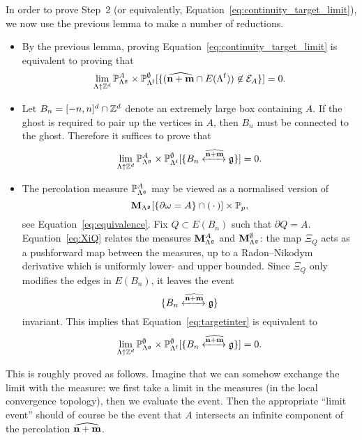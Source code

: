 In order to prove Step~2 (or equivalently, Equation~\eqref{eq:continuity_target_limit}),
we now use the previous lemma to make a number of reductions.
\begin{itemize}
    \item By the previous lemma,
    proving Equation~\eqref{eq:continuity_target_limit} is equivalent to proving that 
    \[
        \lim_{\Lambda\uparrow\mathbb Z^d}
        \mathbb P_{\Lambda^\mathfrak g}^A\times\mathbb P_{\Lambda^{\operatorname{f}}}^\emptyset
            [\{(\widehat{\mathbf{n}+\mathbf{m}}\cap E(\Lambda^{\operatorname{f}}))\not\in\mathcal E_A\}]=0.
    \]
    \item Let $B_n=[-n,n]^d\cap \mathbb Z^d$ denote an extremely large box
    containing $A$.
    If the ghost is required to pair up the vertices in $A$,
    then $B_n$ must be connected to the ghost.
    Therefore it suffices to prove that
    \begin{equation}
        \label{eq:targetinter}
        \lim_{\Lambda\uparrow\Z^d}
        \P_{\Lambda^\frakg}^A\times\P_{\Lambda^\f}^\emptyset
            [\{B_n \xleftrightarrow{\widehat{\n+\m}}\frakg\}]=0.
    \end{equation}
    \item The percolation measure $\mathbb P_{\Lambda^\mathfrak g}^A$ may be viewed
    as a normalised version of \[\mathbf{M}_{\Lambda^\mathfrak g}[\{\partial\omega=A\}\cap(\,\cdot\,)]\times \mathbb P_p,\] see Equation~\eqref{eq:equivalence}.
    Fix $Q\subset E(B_n)$ such that $\partial Q=A$.
    Equation~\eqref{eq:XiQ} relates the measures $\mathbf{M}_{\Lambda^\mathfrak g}^A$
    and $\mathbf{M}_{\Lambda^\mathfrak g}^\emptyset$:
    the map $\Xi_Q$ acts as a pushforward map
    between the measures, up to a Radon--Nikodym derivative which is uniformly
    lower- and upper bounded.
    Since $\Xi_Q$ only modifies the edges in $E(B_n)$, it leaves the event \[\{B_n \xleftrightarrow{\widehat{\mathbf{n}+\mathbf{m}}}\mathfrak g\}\] invariant.
    This implies that Equation~\eqref{eq:targetinter} is equivalent to 
    \begin{equation}
        \lim_{\Lambda\uparrow\mathbb Z^d}
        \mathbb P_{\Lambda^\mathfrak g}^\emptyset\times\mathbb P_{\Lambda^{\operatorname{f}}}^\emptyset
            [\{B_n \xleftrightarrow{\widehat{\mathbf{n}+\mathbf{m}}}\mathfrak g\}]=0.
    \end{equation}
\end{itemize}
 



This is roughly proved as follows.
Imagine that we can somehow exchange the limit with the measure:
we first take a limit in the measures (in the local convergence topology),
then we evaluate the event.
Then the appropriate ``limit event'' should of course be the event that
$A$ intersects an infinite component of the percolation $\widehat{\mathbf{n}+\mathbf{m}}$.

